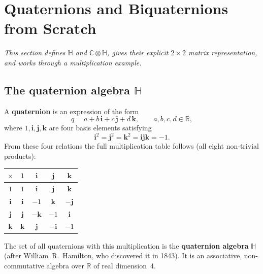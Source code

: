 \documentclass[12pt,a4paper]{article}
\theoremstyle{definition}
\theoremstyle{remark}
\begin{document}
\section{Quaternions and Biquaternions from Scratch}
\label{sec:biquaternions}

\textit{This section defines $\mathbb{H}$ and $\mathbb{C}\otimes\mathbb{H}$,
gives their explicit $2\times 2$ matrix representation, and works through a
multiplication example.}

\subsection{The quaternion algebra $\mathbb{H}$}

A \textbf{quaternion} is an expression of the form
\begin{equation}
  q = a + b\,\mathbf{i} + c\,\mathbf{j} + d\,\mathbf{k},
  \qquad a,b,c,d \in \mathbb{R},
\end{equation}
where $1, \mathbf{i}, \mathbf{j}, \mathbf{k}$ are four basis elements satisfying
\begin{equation}
  \label{eq:quat_rules}
  \mathbf{i}^2 = \mathbf{j}^2 = \mathbf{k}^2 = \mathbf{i}\mathbf{j}\mathbf{k} = -1.
\end{equation}
From these four relations the full multiplication table follows (all eight
non-trivial products):

\begin{center}
\begin{tabular}{c|cccc}
  $\times$ & $1$ & $\mathbf{i}$ & $\mathbf{j}$ & $\mathbf{k}$ \\
  \hline
  $1$           & $1$  & $\mathbf{i}$  & $\mathbf{j}$  & $\mathbf{k}$  \\
  $\mathbf{i}$  & $\mathbf{i}$  & $-1$ & $\mathbf{k}$  & $-\mathbf{j}$ \\
  $\mathbf{j}$  & $\mathbf{j}$  & $-\mathbf{k}$ & $-1$ & $\mathbf{i}$  \\
  $\mathbf{k}$  & $\mathbf{k}$  & $\mathbf{j}$  & $-\mathbf{i}$ & $-1$ \\
\end{tabular}
\end{center}

The set of all quaternions with this multiplication is the
\textbf{quaternion algebra} $\mathbb{H}$ (after William~R.\ Hamilton, who
discovered it in 1843).  It is an associative, non-commutative algebra over
$\mathbb{R}$ of real dimension~4.
\end{document}
